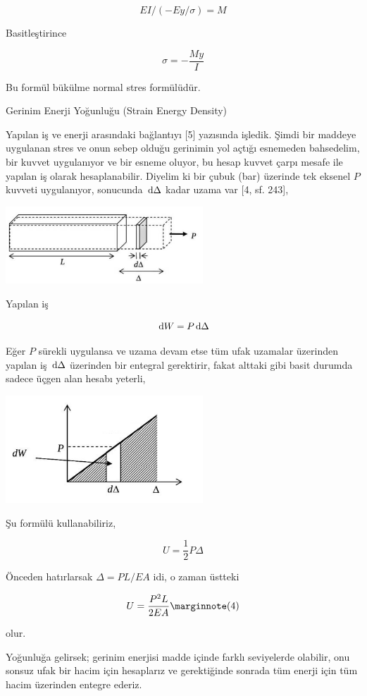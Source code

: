 \documentclass[12pt,fleqn]{article}\usepackage{../../common}
\begin{document}
$$
EI / (-Ey / \sigma )  = M
$$

Basitleştirince

$$
\sigma = - \frac{M y}{I}
$$

Bu formül bükülme normal stres formülüdür.

Gerinim Enerji Yoğunluğu (Strain Energy Density)

Yapılan iş ve enerji arasındaki bağlantıyı [5] yazısında işledik. Şimdi bir
maddeye uygulanan stres ve onun sebep olduğu gerinimin yol açtığı esnemeden
bahsedelim, bir kuvvet uygulanıyor ve bir esneme oluyor, bu hesap kuvvet çarpı
mesafe ile yapılan iş olarak hesaplanabilir. Diyelim ki bir çubuk (bar) üzerinde
tek eksenel $P$ kuvveti uygulanıyor, sonucunda $\,\mathrm{d} \Delta$ kadar uzama var
[4, sf. 243],

\includegraphics[width=20em]{phy_020_strs_00_07.jpg}

Yapılan iş

$$
\,\mathrm{d} W = P \,\mathrm{d} \Delta
$$

Eğer $P$ sürekli uygulansa ve uzama devam etse tüm ufak uzamalar üzerinden
yapılan iş $\,\mathrm{d} \Delta$ üzerinden bir entegral gerektirir, fakat alttaki
gibi basit durumda sadece üçgen alan hesabı yeterli,

\includegraphics[width=20em]{phy_020_strs_00_08.jpg}

Şu formülü kullanabiliriz,

$$
U = \frac{1}{2} P \Delta
$$

Önceden hatırlarsak $\Delta = PL / EA$ idi, o zaman üstteki 

$$
U = \frac{P^2 L}{2 E A}
\mlabel{4}
$$

olur.

Yoğunluğa gelirsek; gerinim enerjisi madde içinde farklı seviyelerde olabilir,
onu sonsuz ufak bir hacim için hesaplarız ve gerektiğinde sonrada tüm enerji
için tüm hacim üzerinden entegre ederiz.
\end{document}
